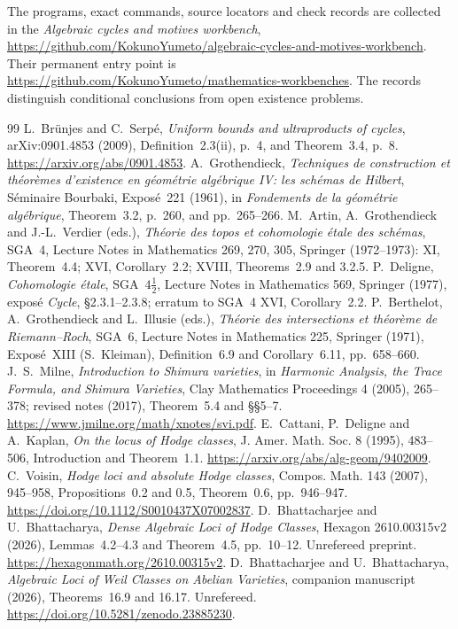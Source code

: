 \documentclass[11pt]{article}
\theoremstyle{definition}
\theoremstyle{remark}
\newcommand{\workbenchurl}{https://github.com/KokunoYumeto/algebraic-cycles-and-motives-workbench}
\newcommand{\recordurl}{https://github.com/KokunoYumeto/mathematics-workbenches}
\begin{document}
The programs, exact commands, source locators and check records are
collected in the \emph{Algebraic cycles and motives workbench},
\url{\workbenchurl}. Their permanent entry point is
\url{\recordurl}. The records distinguish conditional conclusions
from open existence problems.
\begin{thebibliography}{99}
 L.~Br\"unjes and C.~Serp\'e, \emph{Uniform bounds and ultraproducts of cycles}, arXiv:0901.4853 (2009), Definition~2.3(ii), p.~4, and Theorem~3.4, p.~8. \url{https://arxiv.org/abs/0901.4853}.
 A.~Grothendieck, \emph{Techniques de construction et th\'eor\`emes d'existence en g\'eom\'etrie alg\'ebrique IV: les sch\'emas de Hilbert}, S\'eminaire Bourbaki, Expos\'e~221 (1961), in \emph{Fondements de la g\'eom\'etrie alg\'ebrique}, Theorem~3.2, p.~260, and pp.~265--266.
 M.~Artin, A.~Grothendieck and J.-L.~Verdier (eds.), \emph{Th\'eorie des topos et cohomologie \'etale des sch\'emas}, SGA~4, Lecture Notes in Mathematics 269, 270, 305, Springer (1972--1973): XI, Theorem~4.4; XVI, Corollary~2.2; XVIII, Theorems~2.9 and 3.2.5.
 P.~Deligne, \emph{Cohomologie \'etale}, SGA~$4\frac12$, Lecture Notes in Mathematics 569, Springer (1977), expos\'e \emph{Cycle}, \S2.3.1--2.3.8; erratum to SGA~4 XVI, Corollary~2.2.
 P.~Berthelot, A.~Grothendieck and L.~Illusie (eds.), \emph{Th\'eorie des intersections et th\'eor\`eme de Riemann--Roch}, SGA~6, Lecture Notes in Mathematics 225, Springer (1971), Expos\'e~XIII (S.~Kleiman), Definition~6.9 and Corollary~6.11, pp.~658--660.
 J.~S.~Milne, \emph{Introduction to Shimura varieties}, in \emph{Harmonic Analysis, the Trace Formula, and Shimura Varieties}, Clay Mathematics Proceedings 4 (2005), 265--378; revised notes (2017), Theorem~5.4 and \S\S5--7. \url{https://www.jmilne.org/math/xnotes/svi.pdf}.
 E.~Cattani, P.~Deligne and A.~Kaplan, \emph{On the locus of Hodge classes}, J. Amer. Math. Soc. 8 (1995), 483--506, Introduction and Theorem~1.1. \url{https://arxiv.org/abs/alg-geom/9402009}.
 C.~Voisin, \emph{Hodge loci and absolute Hodge classes}, Compos. Math. 143 (2007), 945--958, Propositions~0.2 and 0.5, Theorem~0.6, pp.~946--947. \url{https://doi.org/10.1112/S0010437X07002837}.
 D.~Bhattacharjee and U.~Bhattacharya, \emph{Dense Algebraic Loci of Hodge Classes}, Hexagon 2610.00315v2 (2026), Lemmas~4.2--4.3 and Theorem~4.5, pp.~10--12. Unrefereed preprint. \url{https://hexagonmath.org/2610.00315v2}.
 D.~Bhattacharjee and U.~Bhattacharya, \emph{Algebraic Loci of Weil Classes on Abelian Varieties}, companion manuscript (2026), Theorems~16.9 and 16.17. Unrefereed. \url{https://doi.org/10.5281/zenodo.23885230}.

\end{thebibliography}
\end{document}
